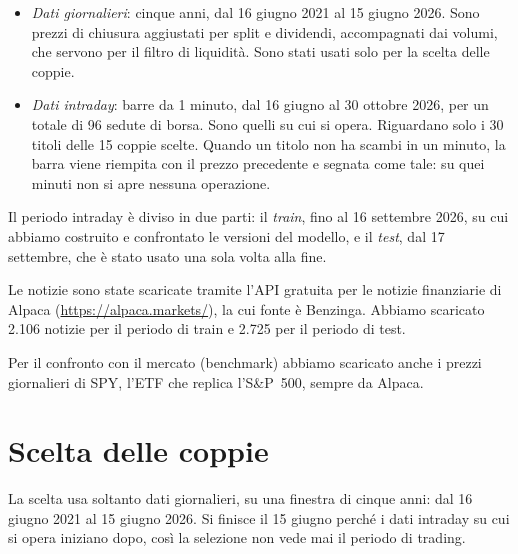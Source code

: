 \documentclass[11pt,a4paper]{article}
\begin{document}
\begin{itemize}
  \item \emph{Dati giornalieri}: cinque anni, dal 16 giugno 2021 al 15 giugno 2026. Sono prezzi di chiusura aggiustati per split e dividendi, accompagnati dai volumi, che servono per il filtro di liquidità. Sono stati usati solo per la scelta delle coppie.
  \item \emph{Dati intraday}: barre da 1 minuto, dal 16 giugno al 30 ottobre 2026, per un totale di 96 sedute di borsa. Sono quelli su cui si opera. Riguardano solo i 30 titoli delle 15 coppie scelte. Quando un titolo non ha scambi in un minuto, la barra viene riempita con il prezzo precedente e segnata come tale: su quei minuti non si apre nessuna operazione.
\end{itemize}

Il periodo intraday è diviso in due parti: il \emph{train}, fino al 16 settembre 2026, su cui abbiamo costruito e confrontato le versioni del modello, e il \emph{test}, dal 17 settembre, che è stato usato una sola volta alla fine.

Le notizie sono state scaricate tramite l'API gratuita per le notizie finanziarie di Alpaca (\url{https://alpaca.markets/}), la cui fonte è Benzinga. Abbiamo scaricato 2.106 notizie per il periodo di train e 2.725 per il periodo di test.

Per il confronto con il mercato (benchmark) abbiamo scaricato anche i prezzi giornalieri di SPY, l'ETF che replica l'S\&P~500, sempre da Alpaca.

\section{Scelta delle coppie}
La scelta usa soltanto dati giornalieri, su una finestra di cinque anni: dal 16 giugno 2021 al 15 giugno 2026. Si finisce il 15 giugno perché i dati intraday su cui si opera iniziano dopo, così la selezione non vede mai il periodo di trading.
\end{document}
